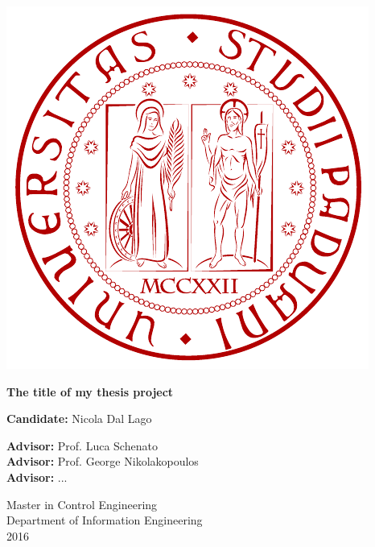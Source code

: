 \documentclass[11pt, a4paper, onecolumn, fleqn, twoside, titlepage, openright]{book}
\begin{document}
	\renewcommand{\thepage}{\roman{page}} 		%

	\thispagestyle{empty}

	\begin{center}
	    \begin{minipage}{0.75\linewidth}
	        \centering
	        \includegraphics[width=0.5\linewidth]{images/logo_unipd.pdf}
	        \vspace{3cm}
	    
	        {\Large \textbf{The title of my thesis project} \par}
	        \vspace{3cm}
	    
	        \hspace{5cm}
	        \textbf{Candidate:} Nicola Dal Lago
	        \vspace{3cm}

	        \hspace{-8.7cm}\textbf{Advisor:} Prof. Luca Schenato \\
	        \hspace{-7.1cm}\textbf{Advisor:} Prof. George Nikolakopoulos \\
	        \hspace{-11.8cm}\textbf{Advisor:} ...
	        \vspace{3cm}

	        Master in Control Engineering \\
	        Department of Information Engineering \\ 
	        2016
	        
	    \end{minipage}
	\end{center}
\end{document}
